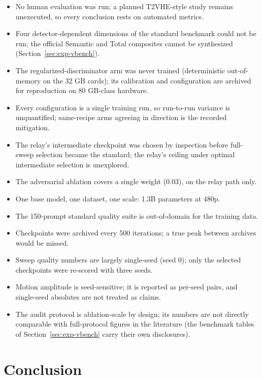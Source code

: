 \documentclass[11pt,a4paper]{article}
\begin{document}
\begin{itemize}
  \item No human evaluation was run; a planned T2VHE-style study \cite{t2vhe} remains unexecuted, so every conclusion rests on automated metrics.
  \item Four detector-dependent dimensions of the standard benchmark could not be run; the official Semantic and Total composites cannot be synthesized (Section~\ref{sec:exp-vbench}).
  \item The regularized-discriminator arm was never trained (deterministic out-of-memory on the 32 GB cards); its calibration and configuration are archived for reproduction on 80 GB-class hardware.
  \item Every configuration is a single training run, so run-to-run variance is unquantified; same-recipe arms agreeing in direction is the recorded mitigation.
  \item The relay's intermediate checkpoint was chosen by inspection before full-sweep selection became the standard; the relay's ceiling under optimal intermediate selection is unexplored.
  \item The adversarial ablation covers a single weight (0.03), on the relay path only.
  \item One base model, one dataset, one scale: 1.3B parameters at 480p.
  \item The 150-prompt standard quality suite is out-of-domain for the training data.
  \item Checkpoints were archived every 500 iterations; a true peak between archives would be missed.
  \item Sweep quality numbers are largely single-seed (seed 0); only the selected checkpoints were re-scored with three seeds.
  \item Motion amplitude is seed-sensitive; it is reported as per-seed pairs, and single-seed absolutes are not treated as claims.
  \item The audit protocol is ablation-scale by design; its numbers are not directly comparable with full-protocol figures in the literature (the benchmark tables of Section~\ref{sec:exp-vbench} carry their own disclosures).
\end{itemize}

\section{Conclusion}\label{sec:conclusion}
\end{document}
